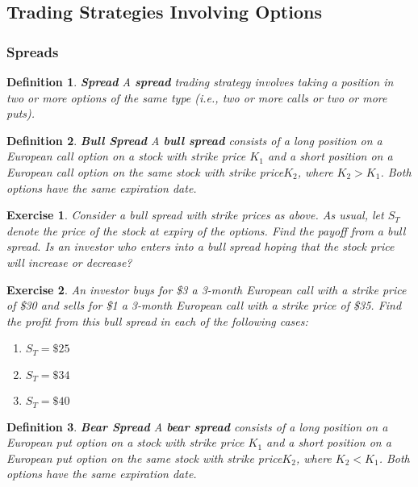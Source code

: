 \documentclass[letterpaper,10pt]{article}
\newtheorem{df}{Definition}[section]
\newtheorem{ex}{Exercise}
\begin{document}
\bigskip

\subsection{Trading Strategies Involving Options}

\subsubsection{Spreads}

\begin{df}{\bf Spread}
A {\bf spread} trading strategy involves taking a position in two or more options of the same type (i.e., two or more calls or two or more puts).
\end{df}

\begin{df}{\bf Bull Spread}
A {\bf bull spread} consists of a long position on a European call option on a stock with strike price $K_1$ and a short position on a European call option on the same stock with strike price$K_2$, where $K_2>K_1$. Both options have the same expiration date.
\end{df}


\begin{ex}
Consider a bull spread with strike prices as above.  As usual, let $S_T$ denote the price of the stock at expiry of the options.  Find the payoff from a bull spread. Is an investor who enters into a bull spread hoping that the stock price will increase or decrease?
\end{ex}


\begin{ex}
An investor buys for \$3 a 3-month European call with a strike price of \$30 and sells for \$1 a 3-month European call with a strike price of \$35. Find the profit from this bull spread in each of the following cases:
\begin{enumerate}
\item[(a)] $S_T=\$25$
\item[(b)] $S_T=\$34$
\item[(c)] $S_T=\$40$
\end{enumerate}
\end{ex}



\begin{df}{\bf Bear Spread}
A {\bf bear spread} consists of a long position on a European put option on a stock with strike price $K_1$ and a short position on a European put option on the same stock with strike price$K_2$, where $K_2<K_1$. Both options have the same expiration date.
\end{df}
\end{document}
